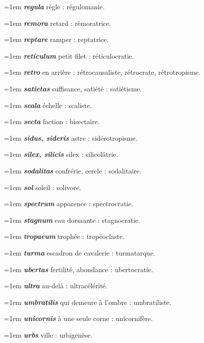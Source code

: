 \hangindent=1em \textbf{\textit{regula}} règle : régulomanie.\par
\hangindent=1em \textbf{\textit{remora}} retard : rémoratrice.\par
\hangindent=1em \textbf{\textit{reptare}} ramper : reptatrice.\par
\hangindent=1em \textbf{\textit{reticulum}} petit filet : réticulocratie.\par
\hangindent=1em \textbf{\textit{retro}} en arrière : rétrocausaliste, rétrocrate, rétrotropisme.\par
\hangindent=1em \textbf{\textit{satietas}} suffisance, satiété : satiétisme.\par
\hangindent=1em \textbf{\textit{scala}} échelle : scaliste.\par
\hangindent=1em \textbf{\textit{secta}} faction : bisectaire.\par
\hangindent=1em \textbf{\textit{sidus, sideris}} astre : sidérotropisme.\par
\hangindent=1em \textbf{\textit{silex, silicis}} silex : silicolâtrie.\par
\hangindent=1em \textbf{\textit{sodalitas}} confrérie, cercle : sodalitaire.\par
\hangindent=1em \textbf{\textit{sol}} soleil : solivore.\par
\hangindent=1em \textbf{\textit{spectrum}} apparence : spectrocratie.\par
\hangindent=1em \textbf{\textit{stagnum}} eau dormante : stagnocratie.\par
\hangindent=1em \textbf{\textit{tropaeum}} trophée : tropéoclaste.\par
\hangindent=1em \textbf{\textit{turma}} escadron de cavalerie : turmatarque.\par
\hangindent=1em \textbf{\textit{ubertas}} fertilité, abondance : ubertocratie.\par
\hangindent=1em \textbf{\textit{ultra}} au-delà : ultracélérité.\par
\hangindent=1em \textbf{\textit{umbratilis}} qui demeure à l'ombre : umbratiliste.\par
\hangindent=1em \textbf{\textit{unicornis}} à une seule corne : unicornifère.\par
\hangindent=1em \textbf{\textit{urbs}} ville : urbigenèse.\par
